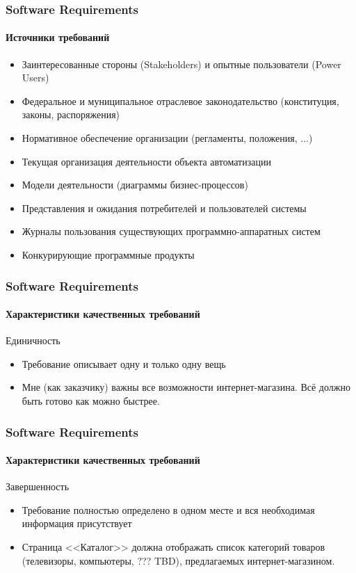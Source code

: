 \documentclass[aspectratio=169, 12pt]{beamer}
\begin{document}
\begin{frame}[t]
    \frametitle{Software Requirements}
    \framesubtitle{Источники требований} \pause
    \begin{itemize}
        \item Заинтересованные стороны (Stakeholders) и опытные пользователи (Power Users) \pause
        \item Федеральное и муниципальное отраслевое законодательство
              (конституция, законы, распоряжения) \pause
        \item Нормативное обеспечение организации (регламенты, положения, ...) \pause
        \item Текущая организация деятельности объекта автоматизации \pause
        \item Модели деятельности (диаграммы бизнес-процессов) \pause
        \item Представления и ожидания потребителей и пользователей системы \pause
        \item Журналы пользования существующих программно-аппаратных систем \pause
        \item Конкурирующие программные продукты
    \end{itemize}
\end{frame}

\begin{frame}[t]
    \frametitle{Software Requirements}
    \framesubtitle{Характеристики качественных требований}
    Единичность \newline
    \begin{itemize}
        \item Требование описывает одну и только одну вещь \newline \pause
        \item Мне (как заказчику) важны все возможности интернет-магазина.
              Всё должно быть готово как можно быстрее.
    \end{itemize}
\end{frame}

\begin{frame}[t]
    \frametitle{Software Requirements}
    \framesubtitle{Характеристики качественных требований}
    Завершенность \newline
    \begin{itemize}
        \item Требование полностью определено в одном месте и вся необходимая информация присутствует \newline \pause
        \item Страница <<Каталог>> должна отображать список категорий товаров (телевизоры, компьютеры, ??? TBD),
              предлагаемых интернет-магазином.
    \end{itemize}
\end{frame}
\end{document}
